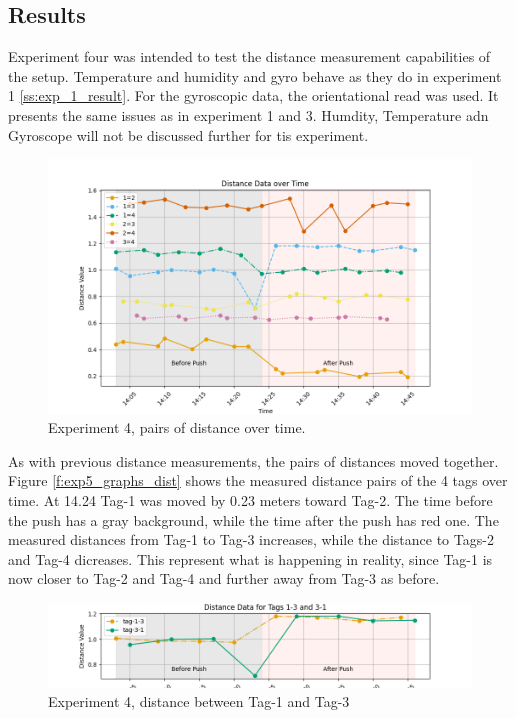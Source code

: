 \subsection{Results}
\label{ss:exp_4_result}

Experiment four was intended to test the distance measurement capabilities of the setup.
Temperature and humidity and gyro behave as they do in experiment 1 \ref{ss:exp_1_result}.
For the gyroscopic data, the orientational read was used.
It presents the same issues as in experiment 1 and 3.
Humdity, Temperature adn Gyroscope will not be discussed further for tis experiment.

\begin{figure}[ht!]
	\includegraphics[width=\linewidth]{graphics/exp/exp5_dist_data_plot_2_combined.png}
	\caption{Experiment 4, pairs of distance over time.}
	\label{f:exp3_graphs_dist}
\end{figure}


As with previous distance measurements, the pairs of distances moved together.
Figure \ref{f:exp5_graphs_dist} shows the measured distance pairs of the 4 tags over time.
At 14.24 Tag-1 was moved by 0.23 meters toward Tag-2.
The time before the push has a gray background, while the time after the push has red one.
The measured distances from Tag-1 to Tag-3 increases, while the distance to Tags-2 and Tag-4 dicreases.
This represent what is happening in reality, since Tag-1 is now closer to Tag-2 and Tag-4 and further away from Tag-3 as before.

\begin{figure}[ht!]
	\includegraphics[width=\linewidth]{graphics/exp/exp5_dist_data_plot_2_split_1_3.png}
	\caption{Experiment 4, distance between Tag-1 and Tag-3}
	\label{f:exp3_graphs_dist_split_1_3}
\end{figure}


